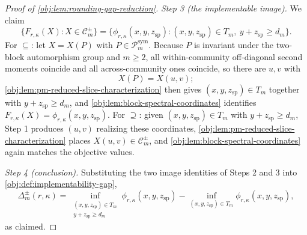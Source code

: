 \begin{proof}[Proof of \cref{obj:lem:rounding-gap-reduction}]
\emph{Step 3 (the implementable image).}  We claim
\[
\bigl\{F_{r,\kappa}(X):X\in\mathcal C_m^{\pm}\bigr\}
=\bigl\{\phi_{r,\kappa}(x,y,z_{\mathrm{sp}}):(x,y,z_{\mathrm{sp}})\in T_m,\ y+z_{\mathrm{sp}}\ge d_m\bigr\}.
\]
For \(\subseteq\): let \(X=X(P)\) with \(P\in\mathcal P_m^{\mathrm{sym}}\).  Because \(P\) is invariant under the two-block automorphism group and \(m\ge2\), all within-community off-diagonal second moments coincide and all across-community ones coincide, so there are \(u,v\) with
\[
X(P)=X(u,v);
\]
\cref{obj:lem:pm-reduced-slice-characterization} then gives \((x,y,z_{\mathrm{sp}})\in T_m\) together with \(y+z_{\mathrm{sp}}\ge d_m\), and \cref{obj:lem:block-spectral-coordinates} identifies \(F_{r,\kappa}(X)=\phi_{r,\kappa}(x,y,z_{\mathrm{sp}})\).  For \(\supseteq\): given \((x,y,z_{\mathrm{sp}})\in T_m\) with \(y+z_{\mathrm{sp}}\ge d_m\), Step 1 produces \((u,v)\) realizing these coordinates, \cref{obj:lem:pm-reduced-slice-characterization} places \(X(u,v)\in\mathcal C_m^{\pm}\), and \cref{obj:lem:block-spectral-coordinates} again matches the objective values. %

\emph{Step 4 (conclusion).}  Substituting the two image identities of Steps 2 and 3 into \cref{obj:def:implementability-gap},
\[
\Delta_m^{\pm}(r,\kappa)
=
\inf_{\substack{(x,y,z_{\mathrm{sp}})\in T_m\\ y+z_{\mathrm{sp}}\ge d_m}}
\phi_{r,\kappa}(x,y,z_{\mathrm{sp}})
-
\inf_{(x,y,z_{\mathrm{sp}})\in T_m}
\phi_{r,\kappa}(x,y,z_{\mathrm{sp}}),
\]
as claimed. %
\end{proof}
